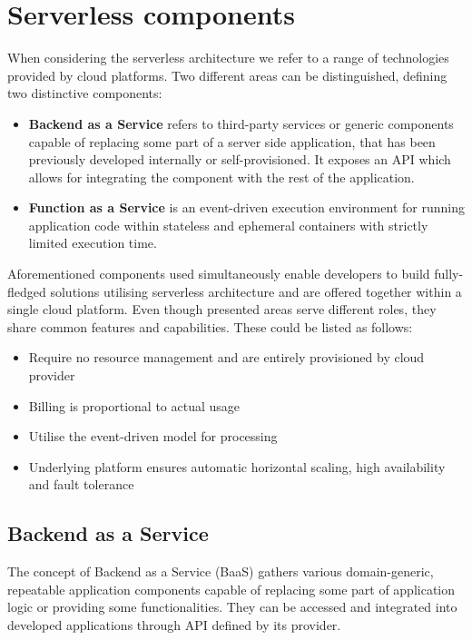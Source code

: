 \section{Serverless components} \label{section:serverless-components}

When considering the serverless architecture we refer to a range of technologies provided by cloud platforms. Two different areas can be distinguished, defining two distinctive components:

\begin{itemize}
    \item \textbf{Backend as a Service} refers to third-party services or generic components capable of replacing some part of a server side application, that has been previously developed internally or self-provisioned. It exposes an API which allows for integrating the component with the rest of the application.
    \item \textbf{Function as a Service} is an event-driven execution environment for running application code within stateless and ephemeral containers with strictly limited execution time.
\end{itemize}

Aforementioned components used simultaneously enable developers to build fully-fledged solutions utilising serverless architecture and are offered together within a single cloud platform.
Even though presented areas serve different roles, they share common features and capabilities. These could be listed as follows:

\begin{itemize}
    \item Require no resource management and are entirely provisioned by cloud provider
    \item Billing is proportional to actual usage
    \item Utilise the event-driven model for processing
    \item Underlying platform ensures automatic horizontal scaling, high availability and fault tolerance
\end{itemize}

\subsection{Backend as a Service}

The concept of Backend as a Service (BaaS) gathers various domain-generic, repeatable application components capable of replacing some part of application logic or providing some functionalities. They can be accessed and integrated into developed applications through API defined by its provider.

